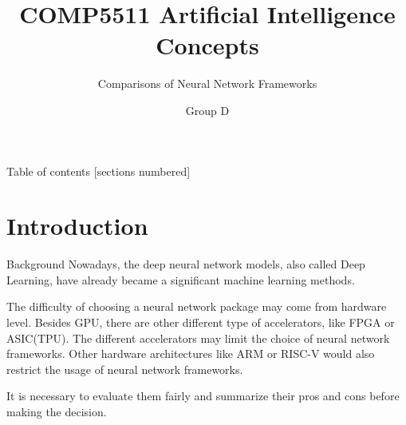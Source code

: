 \documentclass[10pt]{beamer}
\title{COMP5511 Artificial Intelligence Concepts}
\subtitle{Comparisons of Neural Network Frameworks}
\date{}
\author{Group D}
\institute{The Hong Kong Polytechnic University}
\begin{document}
\graphicspath{{img/}}
\maketitle

\begin{frame}{Table of contents}
  [sections numbered]
  \tableofcontents%
\end{frame}

\section[Introduction]{Introduction}
\begin{frame}{Background}
Nowadays, the deep neural network models, also called Deep Learning, have already became a significant machine learning methods.\par
The difficulty of choosing a neural network package may come from hardware level. Besides GPU, there are other different type of accelerators, like FPGA or ASIC(TPU). The different accelerators may limit the choice of neural network frameworks. Other hardware architectures like ARM or RISC-V would also restrict the usage of neural network frameworks.\par
It is necessary to evaluate them fairly and summarize their pros and cons before making the decision.
\end{frame}
\end{document}
